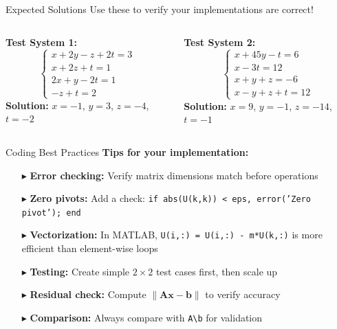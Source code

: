 \documentclass[aspectratio=169]{beamer}
\begin{document}
\begin{frame}{Expected Solutions}
	\alert{Use these to verify your implementations are correct!}
	\vspace{1cm}

	\begin{columns}
		\textbf{Test System 1:}
		\begin{equation*}
			\begin{cases}
				x + 2y - z + 2t = 3 \\
				x + 2z + t = 1      \\
				2x + y - 2t = 1     \\
				-z + t = 2
			\end{cases}
		\end{equation*}
		\textbf{Solution:} $x = -1$, $y = 3$, $z = -4$, $t = -2$

		\textbf{Test System 2:}
		\begin{equation*}
			\begin{cases}
				x + 45y - t = 6 \\
				x - 3t = 12     \\
				x + y + z = -6  \\
				x - y + z + t = 12
			\end{cases}
		\end{equation*}
		\textbf{Solution:} $x = 9$, $y = -1$, $z = -14$, $t = -1$

	\end{columns}
\end{frame}

\begin{frame}{Coding Best Practices}
	\textbf{Tips for your implementation:}
	\begin{itemize}
		\item[$\blacktriangleright$]
		      \textbf{Error checking:} Verify matrix dimensions match before operations
		      \vspace{0.2cm}
		\item[$\blacktriangleright$]
		      \textbf{Zero pivots:} Add a check: \texttt{if abs(U(k,k)) < eps, error('Zero pivot'); end}
		      \vspace{0.2cm}
		\item[$\blacktriangleright$]
		      \textbf{Vectorization:} In MATLAB, \texttt{U(i,:) = U(i,:) - m*U(k,:)} is more efficient than element-wise loops
		      \vspace{0.2cm}
		\item[$\blacktriangleright$]
		      \textbf{Testing:} Create simple $2\times2$ test cases first, then scale up
		      \vspace{0.2cm}
		\item[$\blacktriangleright$]
		      \textbf{Residual check:} Compute $\|\mathbf{Ax} - \mathbf{b}\|$ to verify accuracy
		      \vspace{0.2cm}
		\item[$\blacktriangleright$]
		      \textbf{Comparison:} Always compare with \texttt{A\textbackslash b} for validation
	\end{itemize}
\end{frame}
\end{document}
